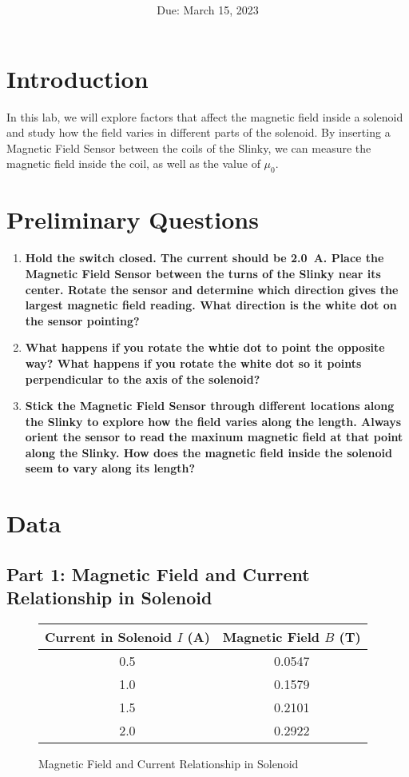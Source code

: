 \documentclass[article, 12pt]{article}
\title{
    \vspace{2in}
    \textmd{\textbf{\labTitle}}
    \normalsize\vspace{0.1in}\\
    \vspace{0.1in}\large{\text{\class: \professor}}
    \vspace{3in}
}
\author{\name}
\date{Due: March 15, 2023}
\begin{document}
    \maketitle
    \thispagestyle{empty}
    \pagebreak
    \section{Introduction}
     In this lab, we will explore factors that affect the magnetic field inside a solenoid and study how the field varies in different parts of the solenoid. By inserting a Magnetic Field Sensor between the coils of the Slinky, we can measure the magnetic field inside the coil, as well as the value of $\mu_0$.
     \section{Preliminary Questions}
     \begin{enumerate}[1.]
        \item \textbf{Hold the switch closed. The current should be \SI{2.0}{\ampere}. Place the Magnetic Field Sensor between the turns of the Slinky near its center. Rotate the sensor and determine which direction gives the largest magnetic field reading. What direction is the white dot on the sensor pointing?}
        \item \textbf{What happens if you rotate the whtie dot to point the opposite way? What happens if you rotate the white dot so it points perpendicular to the axis of the solenoid?}
        \item \textbf{Stick the Magnetic Field Sensor through different locations along the Slinky to explore how the field varies along the length. Always orient the sensor to read the maxinum magnetic field at that point along the Slinky. How does the magnetic field inside the solenoid seem to vary along its length?}
     \end{enumerate}
    \section{Data}
      \subsection{Part 1: Magnetic Field and Current Relationship in Solenoid}    
        \begin{figure}[H]
          \centering
          \begin{tabular}{|c|c|}
            \hline
            Current in Solenoid $I$ (\si{\ampere}) & Magnetic Field $B$ (\si{\tesla})\\
            \hline
            0.5 & 0.0547 \\
            1.0 & 0.1579 \\
            1.5 & 0.2101 \\
            2.0 & 0.2922 \\
            \hline
          \end{tabular}
          \caption{Magnetic Field and Current Relationship in Solenoid}
          \label{fig:current}
        \end{figure}
\end{document}
